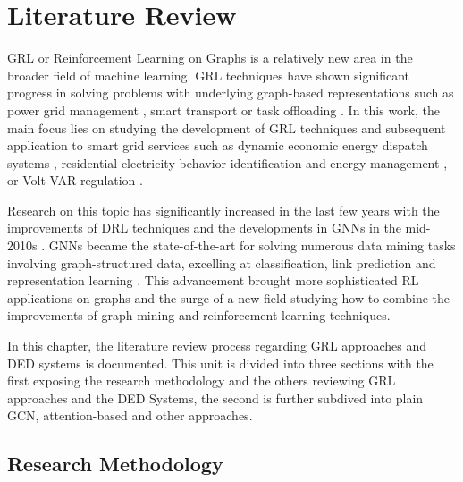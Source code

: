 \chapter{Literature Review} \label{chap:literature-review}

\ac{GRL} or Reinforcement Learning on Graphs is a relatively new area in the broader field of machine learning. \ac{GRL} techniques have shown significant progress in solving problems with underlying graph-based representations such as power grid management \cite{liNovelGraphReinforcement2022, chenGraphRepresentationLearningbased2023}, smart transport \cite{xingBilevelGraphReinforcement2023, almasanDeepReinforcementLearning2022} or task offloading \cite{gaoFastAdaptiveTask2023, liGraphReinforcementLearningbased2022}. In this work, the main focus lies on studying the development of \ac{GRL} techniques and subsequent application to smart grid services such as dynamic economic energy dispatch systems \cite{chenScalableGraphReinforcement2023, xingRealtimeOptimalScheduling2023}, residential electricity behavior identification and energy management \cite{chenGraphRepresentationLearningbased2023}, or Volt-VAR regulation \cite{huMultiagentGraphReinforcement2024}.  \par
Research on this topic has significantly increased in the last few years with the improvements of \ac{DRL} techniques and the developments in \acp{GNN} in the mid-2010s \cite{kipfSemiSupervisedClassificationGraph2017, velickovicGraphAttentionNetworks2018, liGatedGraphSequence2016, gaoGraphUNets2019}. \acp{GNN} became the state-of-the-art for solving numerous data mining tasks involving graph-structured data, excelling at classification, link prediction and representation learning \cite{xuHowPowerfulAre2019, nieReinforcementLearningGraphs2023}. This advancement brought more sophisticated \ac{RL} applications on graphs and the surge of a new field studying how to combine the improvements of graph mining and reinforcement learning techniques. \par
In this chapter, the literature review process regarding \ac{GRL} approaches and \ac{DED} systems is documented. This unit is divided into three sections with the first exposing the research methodology and the others reviewing \ac{GRL} approaches and the \ac{DED Systems}, the second is further subdived into plain \ac{GCN}, attention-based and other approaches.

\section{Research Methodology}

